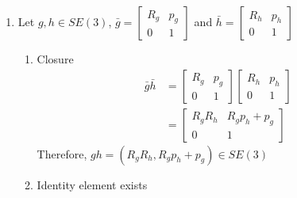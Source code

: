 \documentclass[12pt]{article}
\begin{document}
\begin{enumerate}
        \item Let $g,h \in SE(3)$, $\bar{g} = \begin{bmatrix} 
                                                R_g & p_g \\ 
                                                0 & 1
                                                \end{bmatrix}$ and 
                                      $\bar{h} = \begin{bmatrix} 
                                                R_h & p_h \\ 
                                                0 & 1
                                                \end{bmatrix}$ 
                \begin{enumerate}
                    \item Closure
                        \begin{align}
                            \bar{g} \bar{h} &= \begin{bmatrix} 
                                                R_g & p_g \\ 
                                                0 & 1
                                            \end{bmatrix} 
                                            \begin{bmatrix} 
                                                R_h & p_h \\ 
                                                0 & 1
                                            \end{bmatrix} \\
                                     &= \begin{bmatrix}
                                            R_g R_h & R_g p_h + p_g\\ 
                                            0 & 1
                                        \end{bmatrix}
                        \end{align}
                        Therefore, $gh = (R_g R_h, R_g p_h + p_g) \in SE(3)$
                    \item Identity element exists 
                    

\end{enumerate}
\end{enumerate}
\end{document}
